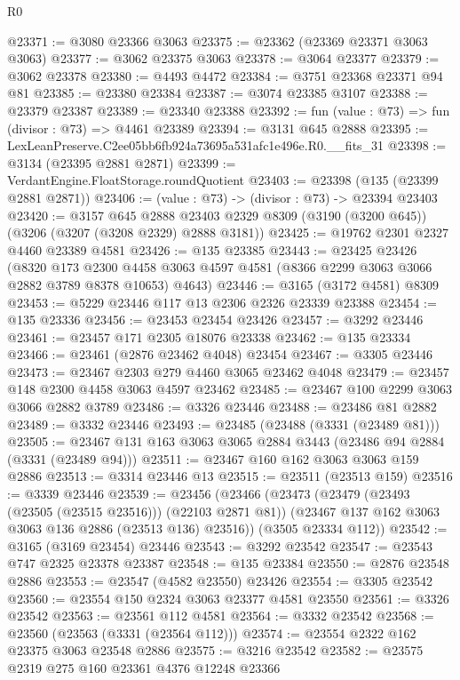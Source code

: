 \begin{lexlean}{R0}
\begin{coremodule}
@23371 := @3080 @23366 @3063
@23375 := @23362 (@23369 @23371 @3063 @3063)
@23377 := @3062 @23375 @3063
@23378 := @3064 @23377
@23379 := @3062 @23378
@23380 := @4493 @4472
@23384 := @3751 @23368 @23371 @94 @81
@23385 := @23380 @23384
@23387 := @3074 @23385 @3107
@23388 := @23379 @23387
@23389 := @23340 @23388
@23392 := fun (value : @73) => fun (divisor : @73) => @4461 @23389
@23394 := @3131 @645 @2888
@23395 := LexLeanPreserve.C2ee05bb6fb924a73695a531afc1e496e.R0.__fits_31
@23398 := @3134 (@23395 @2881 @2871)
@23399 := VerdantEngine.FloatStorage.roundQuotient
@23403 := @23398 (@135 (@23399 @2881 @2871))
@23406 := (value : @73) -> (divisor : @73) -> @23394 @23403
@23420 := @3157
    @645
    @2888
    @23403
    @2329
    @8309
    (@3190 (@3200 @645))
    (@3206 (@3207 (@3208 @2329) @2888 @3181))
@23425 := @19762 @2301 @2327 @4460 @23389 @4581
@23426 := @135 @23385
@23443 := @23425
    @23426
    (@8320
      @173
      @2300
      @4458
      @3063
      @4597
      @4581
      (@8366 @2299 @3063 @3066 @2882 @3789 @8378 @10653)
      @4643)
@23446 := @3165 (@3172 @4581) @8309
@23453 := @5229 @23446 @117 @13 @2306 @2326 @23339 @23388
@23454 := @135 @23336
@23456 := @23453 @23454 @23426
@23457 := @3292 @23446
@23461 := @23457 @171 @2305 @18076 @23338
@23462 := @135 @23334
@23466 := @23461 (@2876 @23462 @4048) @23454
@23467 := @3305 @23446
@23473 := @23467 @2303 @279 @4460 @3065 @23462 @4048
@23479 := @23457 @148 @2300 @4458 @3063 @4597 @23462
@23485 := @23467 @100 @2299 @3063 @3066 @2882 @3789
@23486 := @3326 @23446
@23488 := @23486 @81 @2882
@23489 := @3332 @23446
@23493 := @23485 (@23488 (@3331 (@23489 @81)))
@23505 := @23467 @131 @163 @3063 @3065 @2884 @3443 (@23486 @94 @2884 (@3331 (@23489 @94)))
@23511 := @23467 @160 @162 @3063 @3063 @159 @2886
@23513 := @3314 @23446 @13
@23515 := @23511 (@23513 @159)
@23516 := @3339 @23446
@23539 := @23456
    (@23466
      (@23473
        (@23479 (@23493 (@23505 (@23515 @23516))) (@22103 @2871 @81))
        (@23467 @137 @162 @3063 @3063 @136 @2886 (@23513 @136) @23516))
      (@3505 @23334 @112))
@23542 := @3165 (@3169 @23454) @23446
@23543 := @3292 @23542
@23547 := @23543 @747 @2325 @23378 @23387
@23548 := @135 @23384
@23550 := @2876 @23548 @2886
@23553 := @23547 (@4582 @23550) @23426
@23554 := @3305 @23542
@23560 := @23554 @150 @2324 @3063 @23377 @4581 @23550
@23561 := @3326 @23542
@23563 := @23561 @112 @4581
@23564 := @3332 @23542
@23568 := @23560 (@23563 (@3331 (@23564 @112)))
@23574 := @23554 @2322 @162 @23375 @3063 @23548 @2886
@23575 := @3216 @23542
@23582 := @23575 @2319 @275 @160 @23361 @4376 @12248 @23366

\end{coremodule}
\end{lexlean}
